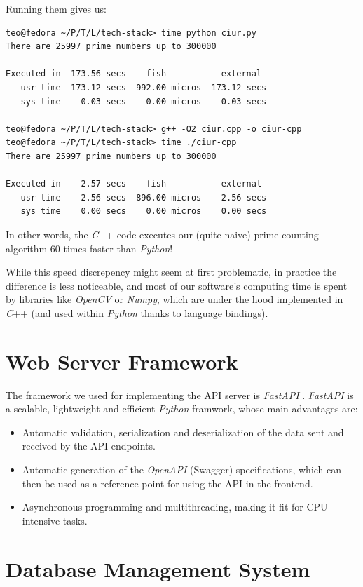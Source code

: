 \documentclass[11pt, a4paper]{report}
\begin{document}
Running them gives us:
\begin{verbatim}
teo@fedora ~/P/T/L/tech-stack> time python ciur.py
There are 25997 prime numbers up to 300000
________________________________________________________
Executed in  173.56 secs    fish           external
   usr time  173.12 secs  992.00 micros  173.12 secs
   sys time    0.03 secs    0.00 micros    0.03 secs

teo@fedora ~/P/T/L/tech-stack> g++ -O2 ciur.cpp -o ciur-cpp
teo@fedora ~/P/T/L/tech-stack> time ./ciur-cpp
There are 25997 prime numbers up to 300000
________________________________________________________
Executed in    2.57 secs    fish           external
   usr time    2.56 secs  896.00 micros    2.56 secs
   sys time    0.00 secs    0.00 micros    0.00 secs
\end{verbatim}

In other words, the \textit{C}++ code executes our (quite naive) prime counting algorithm $60$ times faster than \textit{Python}!

While this speed discrepency might seem at first problematic, in practice the difference is less noticeable, and most of our software's computing time is spent by libraries like \textit{OpenCV} or \textit{Numpy}, which are under the hood implemented in \textit{C}++ (and used within \textit{Python} thanks to language bindings).

\section{Web Server Framework}

The framework we used for implementing the API server is \textit{FastAPI} \cite{FastAPI}. \textit{FastAPI} is a scalable, lightweight and efficient \textit{Python} framwork, whose main advantages are:
\begin{itemize}
    \item Automatic validation, serialization and deserialization of the data sent and received by the API endpoints.
    \item Automatic generation of the \textit{OpenAPI} \cite{open-api} (Swagger) specifications, which can then be used as a reference point for using the API in the frontend.
    \item Asynchronous programming and multithreading, making it fit for CPU-intensive tasks.
\end{itemize}

\section{Database Management System}
\end{document}
